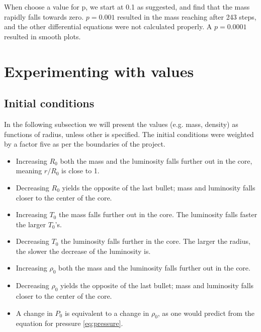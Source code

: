 \documentclass[a4paper,10pt]{article}
\begin{document}
When choose a value for p, we start at 0.1 as suggested, and find that the mass rapidly falls towards zero. $p = 0.001$ resulted in the mass reaching after 243 steps, and the other differential equations were not calculated properly. A $p = 0.0001$ resulted in smooth plots.
 


\section{Experimenting with values}
\subsection{Initial conditions}
In the following subsection we will present the values (e.g. mass, density) as functions of radius, unless other is specified. The initial conditions were weighted by a factor five as per the boundaries of the project.
\begin{itemize}
\item Increasing $R_0$ both the mass and the luminosity falls further out in the core, meaning $r/R_0$ is close to 1. 

\item Decreasing $R_0$ yields the opposite of the last bullet; mass and luminosity falls closer to the center of the core.


\item Increasing $T_0$ the mass falls further out in the core. The luminosity falls faster the larger $T_0$'s.

\item Decreasing $T_0$ the luminosity falls further in the core. The larger the radius, the slower the decrease of the luminosity is. 

\item Increasing $\rho_0$ both the mass and the luminosity falls further out in the core. 

\item Decreasing $\rho_0$ yields the opposite of the last bullet; mass and luminosity falls closer to the center of the core.

\item A change in $P_0$ is equivalent to a change in $\rho_0$, as one would predict from the equation for pressure \eqref{eq:pressure}.
\end{itemize}
\end{document}
